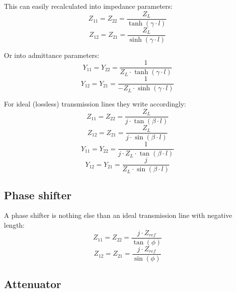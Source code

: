 \documentclass[10pt]{report}
\begin{document}
This can easily recalculated into impedance parameters:
\begin{equation}
Z_{11} = Z_{22} = \frac{Z_L}{\tanh(\gamma\cdot l)}
\end{equation}
\begin{equation}
Z_{12} = Z_{21} = \frac{Z_L}{\sinh(\gamma\cdot l)}
\end{equation}

Or into admittance parameters:
\begin{equation}
Y_{11} = Y_{22} = \frac{1}{Z_L \cdot \tanh(\gamma\cdot l)}
\end{equation}
\begin{equation}
Y_{12} = Y_{21} = \frac{1}{-Z_L\cdot \sinh(\gamma\cdot l)}
\end{equation}

For ideal (lossless) transmission lines they write accordingly:
\begin{equation}
Z_{11} = Z_{22} = \frac{Z_L}{j\cdot\tan(\beta\cdot l)}
\end{equation}
\begin{equation}
Z_{12} = Z_{21} = \frac{Z_L}{j\cdot\sin(\beta\cdot l)}
\end{equation}
\begin{equation}
Y_{11} = Y_{22} = \frac{1}{j\cdot Z_L \cdot \tan(\beta\cdot l)}
\end{equation}
\begin{equation}
Y_{12} = Y_{21} = \frac{j}{Z_L\cdot \sin(\beta\cdot l)}
\end{equation}


\subsection{Phase shifter}

A phase shifter is nothing else than an ideal transmission line
with negative length:
\begin{equation}
Z_{11} = Z_{22} = \frac{j\cdot Z_{ref}}{\tan(\phi)}
\end{equation}
\begin{equation}
Z_{12} = Z_{21} = \frac{j\cdot Z_{ref}}{\sin(\phi)}
\end{equation}


\subsection{Attenuator}
\end{document}
